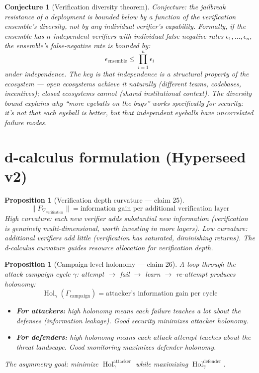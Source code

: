 \documentclass[11pt,a4paper]{article}
\newtheorem{proposition}[definition]{Proposition}
\newtheorem{conjecture}[definition]{Conjecture}
\begin{document}
\begin{conjecture}[Verification diversity theorem]
Conjecture: the jailbreak resistance of a deployment is bounded below
by a function of the verification ensemble's diversity, not by any
individual verifier's capability. Formally, if the ensemble has $n$
independent verifiers with individual false-negative rates
$\epsilon_1, \ldots, \epsilon_n$, the ensemble's false-negative rate
is bounded by:
\[
  \epsilon_{\text{ensemble}} \leq \prod_{i=1}^{n} \epsilon_i
\]
under independence. The key is that independence is a \emph{structural}
property of the ecosystem --- open ecosystems achieve it naturally
(different teams, codebases, incentives); closed ecosystems cannot
(shared institutional context). The diversity bound explains why
``more eyeballs on the bugs'' works specifically for security: it's
not that each eyeball is better, but that independent eyeballs have
uncorrelated failure modes.
\end{conjecture}

\section{d-calculus formulation (Hyperseed v2)}

\begin{proposition}[Verification depth curvature --- claim 25]
\label{prop:ver_depth_curv}
\[
  \|F_{\nabla_{\text{verification}}}\| = \text{information gain per
    additional verification layer}
\]
High curvature: each new verifier adds substantial new information
(verification is genuinely multi-dimensional, worth investing in more
layers). Low curvature: additional verifiers add little (verification
has saturated, diminishing returns). The d-calculus curvature guides
resource allocation for verification depth.
\end{proposition}

\begin{proposition}[Campaign-level holonomy --- claim 26]
\label{prop:campaign_hol}
A loop through the attack campaign cycle $\gamma$: attempt $\to$ fail
$\to$ learn $\to$ re-attempt produces holonomy:
\[
  \operatorname{Hol}_\gamma(\Gamma_{\text{campaign}}) =
    \text{attacker's information gain per cycle}
\]
\begin{itemize}
  \item \textbf{For attackers:} high holonomy means each failure teaches
    a lot about the defenses (information leakage). Good security
    minimizes attacker holonomy.
  \item \textbf{For defenders:} high holonomy means each attack attempt
    teaches about the threat landscape. Good monitoring maximizes
    defender holonomy.
\end{itemize}
The asymmetry goal: minimize $\operatorname{Hol}_\gamma^{\text{attacker}}$
while maximizing $\operatorname{Hol}_\gamma^{\text{defender}}$.
\end{proposition}
\end{document}
